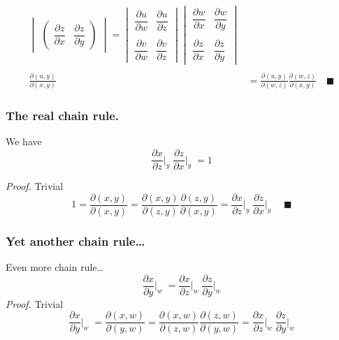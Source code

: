 \documentclass[../../../main.tex]{subfiles}
\begin{document}
\begin{align*}
\begin{vmatrix}
\begin{pmatrix}
            \dfrac{\partial z}{\partial x} & \dfrac{\partial z}{\partial y}
        \end{pmatrix}
                                             \end{vmatrix}=
    \begin{vmatrix}
        \dfrac{\partial u}{\partial w} & \dfrac{\partial u}{\partial z}
        \\\\
        \dfrac{\partial v}{\partial w} & \dfrac{\partial v}{\partial z}
    \end{vmatrix}
    \begin{vmatrix}
        \dfrac{\partial w}{\partial x} & \dfrac{\partial w}{\partial y}
        \\\\
        \dfrac{\partial z}{\partial x} & \dfrac{\partial z}{\partial y}
    \end{vmatrix}
    \\\\
    \frac{\partial (u,y)}{\partial (x,y)} & =\frac{\partial (u,y)}{\partial (w,z)}\frac{\partial (w,z)}{\partial (x,y)} \quad \blacksquare
\end{align*}

\subsubsection{The real chain rule.} We have
\begin{equation*}
    \frac{\partial x}{\partial z}\bigg|_y\;\frac{\partial z}{\partial x}\bigg|_y\;=1
\end{equation*}

\emph{Proof.} Trivial
\begin{equation*}
    1=\frac{\partial (x,y)}{\partial (x,y)}=\frac{\partial (x,y)}{\partial (z,y)}\frac{\partial (z,y)}{\partial (x,y)}=\frac{\partial x}{\partial z}\bigg|_y\;\frac{\partial z}{\partial x}\bigg|_y\; \quad\blacksquare
\end{equation*}

\subsubsection{Yet another chain rule\dots} Even more chain rule\dots
\begin{equation*}
    \frac{\partial x}{\partial y}\bigg|_w\;=\frac{\partial x}{\partial z}\bigg|_w\;\frac{\partial z}{\partial y}\bigg|_w
\end{equation*}
\emph{Proof.} Trivial
\begin{equation*}
    \frac{\partial x}{\partial y}\bigg|_w\;=\frac{\partial (x,w)}{\partial (y,w)} =\frac{\partial (x,w)}{\partial (z,w)}\frac{\partial (z,w)}{\partial (y,w)}  =\frac{\partial x}{\partial z}\bigg|_w\;\frac{\partial z}{\partial y}\bigg|_w
\end{equation*}
\end{document}
